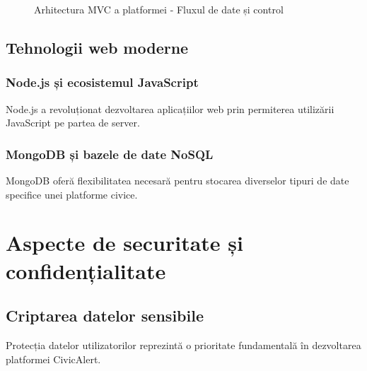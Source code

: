 \documentclass[12pt,a4paper]{report}
\begin{document}
\begin{figure}[htbp]
\caption{Arhitectura MVC a platformei - Fluxul de date și control}
\label{fig:mvc_architecture}
\end{figure}



\subsection{Tehnologii web moderne}

\subsubsection{Node.js și ecosistemul JavaScript}

Node.js a revoluționat dezvoltarea aplicațiilor web prin permiterea utilizării JavaScript pe partea de server.

\subsubsection{MongoDB și bazele de date NoSQL}

MongoDB oferă flexibilitatea necesară pentru stocarea diverselor tipuri de date specifice unei platforme civice.

\section{Aspecte de securitate și confidențialitate}

\subsection{Criptarea datelor sensibile}

Protecția datelor utilizatorilor reprezintă o prioritate fundamentală în dezvoltarea platformei CivicAlert.
\end{document}

